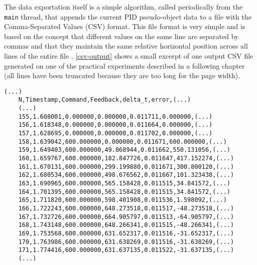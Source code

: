 The data exportation itself is a simple algorithm, called periodically from the \verb|main| thread, that appends the current PID pseudo-object data to a file with the Comma-Separated Values (CSV) format.
This file format is very simple and is based on the concept that different values on the same line are separated by commas and that they maintain the same relative horizontal position across all lines of the entire file \cite{sw:csv}.
\autoref{csv-output} shows a small excerpt of one output CSV file generated on one of the practical experiments described in a following chapter (all lines have been truncated because they are too long for the page width).

%
\begin{lstlisting}[float=htp,caption=Excerpt from an experimental data CSV output file,label=csv-output]
	(...)
	N,Timestamp,Command,Feedback,delta_t,error,(...)
	(...)
	155,1.608001,0.000000,0.000000,0.011711,0.000000,(...)
	156,1.618348,0.000000,0.000000,0.011664,0.000000,(...)
	157,1.628695,0.000000,0.000000,0.011702,0.000000,(...)
	158,1.639042,600.000000,0.000000,0.011671,600.000000,(...)
	159,1.649403,600.000000,49.868944,0.011662,550.131056,(...)
	160,1.659767,600.000000,182.847726,0.011647,417.152274,(...)
	161,1.670131,600.000000,299.199880,0.011671,300.800120,(...)
	162,1.680534,600.000000,498.676562,0.011667,101.323438,(...)
	163,1.690965,600.000000,565.158428,0.011515,34.841572,(...)
	164,1.701395,600.000000,565.158428,0.011515,34.841572,(...)
	165,1.711820,600.000000,598.401908,0.011536,1.598092,(...)
	166,1.722243,600.000000,648.273518,0.011517,-48.273518,(...)
	167,1.732726,600.000000,664.905797,0.011513,-64.905797,(...)
	168,1.743148,600.000000,648.266341,0.011515,-48.266341,(...)
	169,1.753568,600.000000,631.652317,0.011516,-31.652317,(...)
	170,1.763986,600.000000,631.638269,0.011516,-31.638269,(...)
	171,1.774416,600.000000,631.637135,0.011522,-31.637135,(...)
	(...)
\end{lstlisting}

